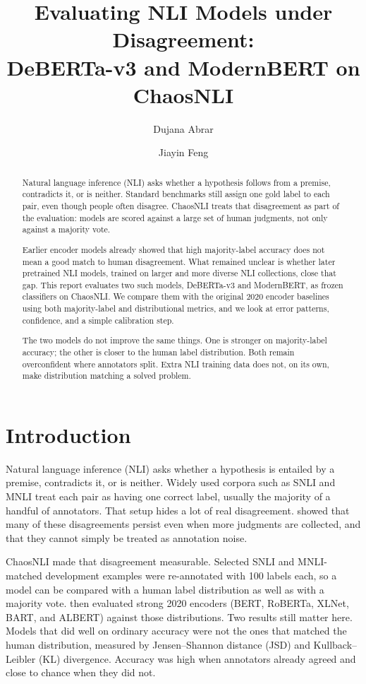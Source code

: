 \documentclass[11pt,a4paper]{article}
\title{\vspace{-1.2em}Evaluating NLI Models under Disagreement:\\
DeBERTa-v3 and ModernBERT on ChaosNLI\vspace{-0.4em}}
\author{Dujana Abrar \and Jiayin Feng}
\date{}
\begin{document}
\maketitle
\vspace{-1.2em}

\begin{abstract}
Natural language inference (NLI) asks whether a hypothesis follows from a premise, contradicts it, or is neither. Standard benchmarks still assign one gold label to each pair, even though people often disagree. ChaosNLI treats that disagreement as part of the evaluation: models are scored against a large set of human judgments, not only against a majority vote.

Earlier encoder models already showed that high majority-label accuracy does not mean a good match to human disagreement. What remained unclear is whether later pretrained NLI models, trained on larger and more diverse NLI collections, close that gap. This report evaluates two such models, DeBERTa-v3 and ModernBERT, as frozen classifiers on ChaosNLI. We compare them with the original 2020 encoder baselines using both majority-label and distributional metrics, and we look at error patterns, confidence, and a simple calibration step.

The two models do not improve the same things. One is stronger on majority-label accuracy; the other is closer to the human label distribution. Both remain overconfident where annotators split. Extra NLI training data does not, on its own, make distribution matching a solved problem.
\end{abstract}

\section{Introduction}

Natural language inference (NLI) asks whether a hypothesis is entailed by a premise, contradicts it, or is neither. Widely used corpora such as SNLI \citep{bowman2015snli} and MNLI \citep{williams2018mnli} treat each pair as having one correct label, usually the majority of a handful of annotators. That setup hides a lot of real disagreement. \citet{pavlick2019inherent} showed that many of these disagreements persist even when more judgments are collected, and that they cannot simply be treated as annotation noise.

ChaosNLI \citep{nie2020chaosnli} made that disagreement measurable. Selected SNLI and MNLI-matched development examples were re-annotated with 100 labels each, so a model can be compared with a human label distribution as well as with a majority vote. \citet{nie2020chaosnli} then evaluated strong 2020 encoders (BERT, RoBERTa, XLNet, BART, and ALBERT) against those distributions. Two results still matter here. Models that did well on ordinary accuracy were not the ones that matched the human distribution, measured by Jensen--Shannon distance (JSD) and Kullback--Leibler (KL) divergence. Accuracy was high when annotators already agreed and close to chance when they did not.
\end{document}
